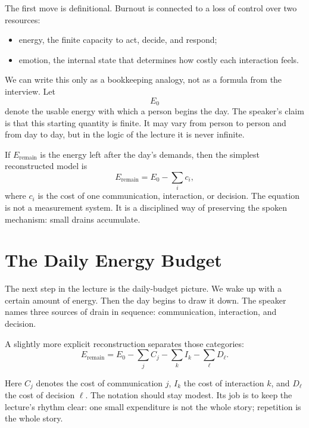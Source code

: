 The first move is definitional. Burnout is connected to a loss of control over two resources:
\begin{itemize}
\item energy, the finite capacity to act, decide, and respond;
\item emotion, the internal state that determines how costly each interaction feels.
\end{itemize}

We can write this only as a bookkeeping analogy, not as a formula from the interview. Let
\[
E_0
\]
denote the usable energy with which a person begins the day. The speaker's claim is that this starting quantity is finite. It may vary from person to person and from day to day, but in the logic of the lecture it is never infinite.

If \(E_{\mathrm{remain}}\) is the energy left after the day's demands, then the simplest reconstructed model is
\begin{equation}
E_{\mathrm{remain}} = E_0 - \sum_i c_i ,
\end{equation}
where \(c_i\) is the cost of one communication, interaction, or decision. The equation is not a measurement system. It is a disciplined way of preserving the spoken mechanism: small drains accumulate.

\section{The Daily Energy Budget}

The next step in the lecture is the daily-budget picture. We wake up with a certain amount of energy. Then the day begins to draw it down. The speaker names three sources of drain in sequence: communication, interaction, and decision.

A slightly more explicit reconstruction separates those categories:
\begin{equation}
E_{\mathrm{remain}}
=
E_0
-
\sum_j C_j
-
\sum_k I_k
-
\sum_{\ell} D_{\ell}.
\end{equation}

Here \(C_j\) denotes the cost of communication \(j\), \(I_k\) the cost of interaction \(k\), and \(D_{\ell}\) the cost of decision \(\ell\). The notation should stay modest. Its job is to keep the lecture's rhythm clear: one small expenditure is not the whole story; repetition is the whole story.

